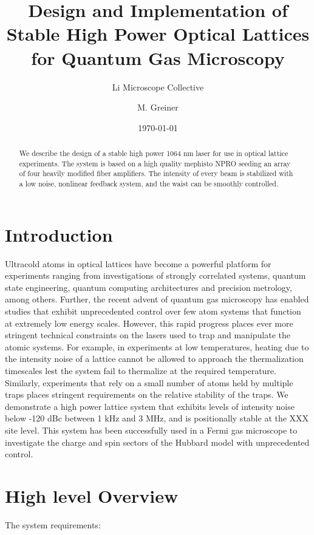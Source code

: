 \documentclass[twocolumn,aps,pra,showpacs,preprintnumbers,bibnotes]{revtex4-1}
\begin{document}
\title{Design and Implementation of Stable High Power Optical Lattices for Quantum Gas Microscopy}


\author{Li Microscope Collective}
\author{M. Greiner}

\date{\today}
\begin{abstract}
We describe the design of a stable high power 1064 nm laser for use in optical lattice experiments. The system is based on a high quality mephisto NPRO seeding an array of four heavily modified fiber amplifiers. The intensity of every beam is stabilized with a low noise, nonlinear feedback system, and the waist can be smoothly controlled. 
\end{abstract}
\maketitle
\section{Introduction}
Ultracold atoms in optical lattices have become a powerful platform for experiments ranging from investigations of strongly correlated systems, quantum state engineering, quantum computing architectures and precision metrology, among others.
Further, the recent advent of quantum gas microscopy has enabled studies that exhibit unprecedented control over few atom systems that function at extremely low energy scales.
However, this rapid progress places ever more stringent technical constraints on the lasers used to trap and manipulate the atomic systems.
For example, in experiments at low temperatures, heating due to the intensity noise of a lattice cannot be allowed to approach the thermalization timescales lest the system fail to thermalize at the required temperature.
Similarly, experiments that rely on a small number of atoms held by multiple traps places stringent requirements on the relative stability of the traps.
We demonstrate a high power lattice system that exhibits levels of intensity noise below -120 dBc between 1 kHz and 3 MHz, and is positionally stable at the XXX site level. 
This system has been successfully used in a Fermi gas microscope to investigate the charge and spin sectors of the Hubbard model with unprecedented control. 


\section{High level Overview}
The system requirements:
\end{document}
